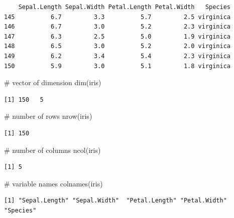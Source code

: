 \documentclass[
  letterpaper,
  DIV=11,
  numbers=noendperiod]{scrreprt}
\newenvironment{Shaded}{\begin{snugshade}}{\end{snugshade}}
\newcommand{\CommentTok}[1]{\textcolor[rgb]{0.37,0.37,0.37}{#1}}
\newcommand{\FunctionTok}[1]{\textcolor[rgb]{0.28,0.35,0.67}{#1}}
\newcommand{\NormalTok}[1]{\textcolor[rgb]{0.00,0.23,0.31}{#1}}
\begin{document}
\begin{tcolorbox}
\begin{verbatim}
    Sepal.Length Sepal.Width Petal.Length Petal.Width   Species
145          6.7         3.3          5.7         2.5 virginica
146          6.7         3.0          5.2         2.3 virginica
147          6.3         2.5          5.0         1.9 virginica
148          6.5         3.0          5.2         2.0 virginica
149          6.2         3.4          5.4         2.3 virginica
150          5.9         3.0          5.1         1.8 virginica
\end{verbatim}

\begin{Shaded}
\begin{Highlighting}[]
\CommentTok{\# vector of dimension}
\FunctionTok{dim}\NormalTok{(iris)}
\end{Highlighting}
\end{Shaded}

\begin{verbatim}
[1] 150   5
\end{verbatim}

\begin{Shaded}
\begin{Highlighting}[]
\CommentTok{\# number of rows}
\FunctionTok{nrow}\NormalTok{(iris)}
\end{Highlighting}
\end{Shaded}

\begin{verbatim}
[1] 150
\end{verbatim}

\begin{Shaded}
\begin{Highlighting}[]
\CommentTok{\# number of columns}
\FunctionTok{ncol}\NormalTok{(iris)}
\end{Highlighting}
\end{Shaded}

\begin{verbatim}
[1] 5
\end{verbatim}

\begin{Shaded}
\begin{Highlighting}[]
\CommentTok{\# variable names}
\FunctionTok{colnames}\NormalTok{(iris)}
\end{Highlighting}
\end{Shaded}

\begin{verbatim}
[1] "Sepal.Length" "Sepal.Width"  "Petal.Length" "Petal.Width"  "Species"     
\end{verbatim}


\end{tcolorbox}
\end{document}
